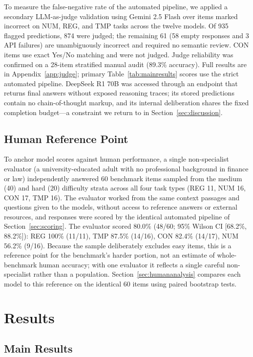 \documentclass[11pt]{article}
\begin{document}
To measure the false-negative rate of the automated pipeline, we applied a secondary LLM-as-judge validation using Gemini 2.5 Flash over items marked incorrect on NUM, REG, and TMP tasks across the twelve models. Of 935 flagged predictions, 874 were judged; the remaining 61 (58 empty responses and 3 API failures) are unambiguously incorrect and required no semantic review. CON items use exact Yes/No matching and were not judged. Judge reliability was confirmed on a 28-item stratified manual audit (89.3\% accuracy). Full results are in Appendix~\ref{app:judge}; primary Table~\ref{tab:mainresults} scores use the strict automated pipeline. DeepSeek R1 70B was accessed through an endpoint that returns final answers without exposed reasoning traces; its stored predictions contain no chain-of-thought markup, and its internal deliberation shares the fixed completion budget---a constraint we return to in Section~\ref{sec:discussion}.

\subsection{Human Reference Point}
\label{sec:humanbaseline}

To anchor model scores against human performance, a single non-specialist evaluator (a university-educated adult with no professional background in finance or law) independently answered 60 benchmark items sampled from the medium (40) and hard (20) difficulty strata across all four task types (REG 11, NUM 16, CON 17, TMP 16). The evaluator worked from the same context passages and questions given to the models, without access to reference answers or external resources, and responses were scored by the identical automated pipeline of Section~\ref{sec:scoring}. The evaluator scored 80.0\% (48/60; 95\% Wilson CI [68.2\%, 88.2\%]): REG 100\% (11/11), TMP 87.5\% (14/16), CON 82.4\% (14/17), NUM 56.2\% (9/16). Because the sample deliberately excludes easy items, this is a reference point for the benchmark's harder portion, not an estimate of whole-benchmark human accuracy; with one evaluator it reflects a single careful non-specialist rather than a population. Section~\ref{sec:humananalysis} compares each model to this reference on the identical 60 items using paired bootstrap tests.

\section{Results}

\subsection{Main Results}
\end{document}
